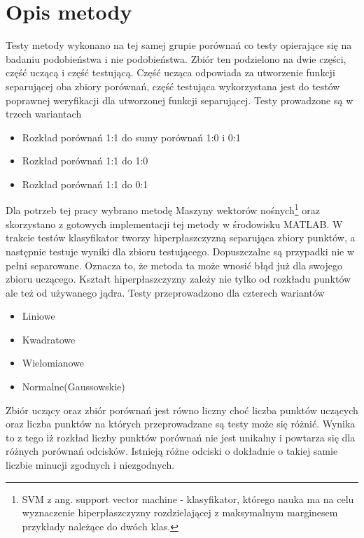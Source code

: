 \section [Opis metody][Opis metody]{Opis metody}
Testy metody wykonano na tej samej grupie porównań co testy opierające się na badaniu podobieństwa i nie podobieństwa. Zbiór ten podzielono na dwie części, część uczącą i część testującą. Część ucząca odpowiada za utworzenie funkcji separującej oba zbiory porównań, część testująca wykorzystana jest do testów poprawnej weryfikacji dla utworzonej funkcji separującej. Testy prowadzone są w trzech wariantach
\renewcommand*{\labelitemi}{\bullet}
\begin{itemize}
	\item Rozkład porównań 1:1 do sumy porównań 1:0 i 0:1
	\item Rozkład porównań 1:1 do 1:0
	\item Rozkład porównań 1:1 do 0:1
\end{itemize}
\vspace{.5cm}\par
Dla potrzeb tej pracy wybrano metodę Maszyny wektorów nośnych\footnote{SVM z ang. support vector machine - klasyfikator, którego nauka ma na celu wyznaczenie hiperpłaszczyzny rozdzielającej z maksymalnym marginesem przykłady należące do dwóch klas.} oraz skorzystano z gotowych implementacji tej metody w środowisku MATLAB. W trakcie testów klasyfikator tworzy hiperpłaszczyzną separująca zbiory punktów, a następnie testuje wyniki dla zbioru testującego. Dopuszczalne są przypadki nie w pełni separowane. Oznacza to, że metoda ta może wnosić błąd już dla swojego zbioru uczącego. Kształt hiperpłaszczyzny zależy nie tylko od rozkładu punktów ale też od używanego jądra. Testy przeprowadzono dla czterech wariantów
\begin{itemize}
\item Liniowe
\item Kwadratowe
\item Wielomianowe
\item Normalne(Gaussowskie)
\end{itemize}
\vspace{.5cm}\par
Zbiór uczący oraz zbiór porównań jest równo liczny choć liczba punktów uczących oraz liczba punktów na których przeprowadzane są testy może się różnić. Wynika to z tego iż rozkład liczby punktów porównań nie jest unikalny i powtarza się dla różnych porównań odcisków. Istnieją różne odciski o dokładnie o takiej samie liczbie minucji zgodnych i niezgodnych.

